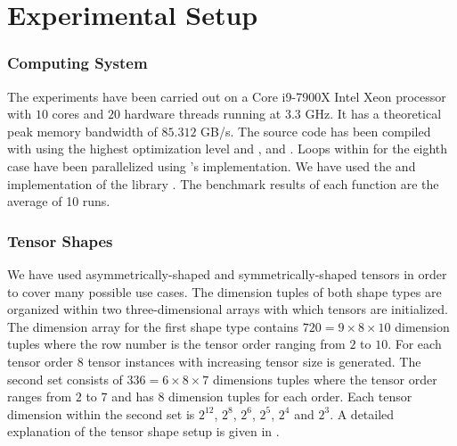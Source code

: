 \section{Experimental Setup}
\label{sec:experimental.setup}
\subsubsection{Computing System} 
The experiments have been carried out on a Core i9-7900X Intel Xeon processor with $10$ cores and $20$ hardware threads running at $3.3$ GHz.
It has a theoretical peak memory bandwidth of $85.312$ GB/s. %
The source code has been compiled with   using the highest optimization level  and ,  and . 
Loops within for the eighth case have been parallelized using 's   implementation.
We have used the  and  implementation of the  library .
The benchmark results of each function are the average of 10 runs.


\subsubsection{Tensor Shapes} 
We have used asymmetrically-shaped and symmetrically-shaped tensors in order to cover many possible use cases. 
The dimension tuples of both shape types are organized within two three-dimensional arrays with which tensors are initialized.
The dimension array for the first shape type contains $720 = 9\times 8 \times 10$ dimension tuples where the row number is the tensor order ranging from $2$ to $10$. 
For each tensor order $8$ tensor instances with increasing tensor size is generated.
The second set consists of $336 = 6\times8\times 7$ dimensions tuples where the tensor order ranges from $2$ to $7$ and has $8$ dimension tuples for each order.
Each tensor dimension within the second set is $2^{12}$, $2^{8}$, $2^{6}$, $2^5$, $2^4$ and $2^3$.
A detailed explanation of the tensor shape setup is given in \cite{bassoy:2019:ttv, bassoy:2018:fast}.

